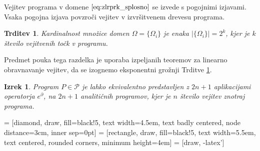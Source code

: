 \documentclass[a4paper, 12pt]{book}
\newcommand{\dP}{\mathcal{P}}
\newcommand{\D}{\partial}
\newtheorem{izrek}{Izrek}[chapter]
\newtheorem{trditev}{Trditev}[izrek]
\begin{document}
Vejitev programa v domene $\eqref{eq:zlrprk_splosno}$ se izvede s pogojnimi izjavami. Vsaka pogojna izjava povzroči vejitev v izvršitvenem drevesu programa.

\begin{trditev}\label{izr:st.zlepkov}
Kardinalnost množice domen $\Omega=\{\Omega_i\}$ je enaka $\lvert\{\Omega_i
\}\rvert=2^k$, kjer je $k$ število vejitvenih točk v programu.
\end{trditev}

Predmet pouka tega razdelka je uporaba izpeljanih teoremov za linearno obravnavanje vejitev, da se izognemo eksponentni grožnji Trditve \ref{izr:st.zlepkov}.

\begin{izrek}\label{izr:2n+1}
Program $P\in\dP$ je lahko ekvivalentno predstavljen z $2n+1$
aplikacijami operatorja $e^\D$, na $2n+1$ analitičnih programov, kjer je
$n$ število vejitev znotraj programa.
\end{izrek}
 = [diamond, draw, fill=black!5, 
    text width=4.5em, text badly centered, node distance=3cm, inner sep=0pt]
 = [rectangle, draw, fill=black!5, 
    text width=5.5em, text centered, rounded corners, minimum height=4em]
 = [draw, -latex']
\end{document}
